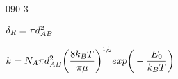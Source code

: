 \begin{mitframe}{090-3}
\begin{listone}
	\item $\blthick_{\gasconst}=\pi{d}_{\helmholtz\exergy}^2$
   
    
    	\begin{listtwo}
        	\item $\thermcond=\nummoles_{\helmholtz}\pi{d}_{\helmholtz\exergy}^2\bigg(\dfrac{8\thermcond_{\exergy}\Temp}{\pi\chempot}\bigg)^{\sfrac{1}{2}}exp\bigg(-\dfrac{\energy_{\init}}{\thermcond_{\exergy}\Temp}\bigg)$           
        \end{listtwo}
\end{listone}    
\end{mitframe}